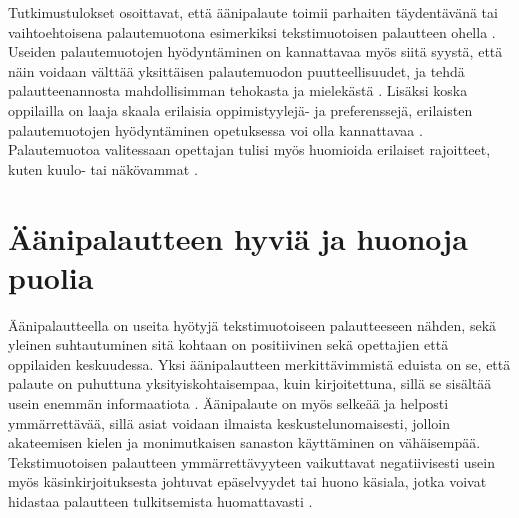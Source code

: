 \documentclass[utf8]{gradu3}
\begin{document}
Tutkimustulokset osoittavat, että äänipalaute toimii parhaiten täydentävänä  tai vaihtoehtoisena palautemuotona esimerkiksi tekstimuotoisen palautteen ohella \parencite[][]{academics, modes, ice}. Useiden palautemuotojen hyödyntäminen on kannattavaa myös siitä syystä, että näin voidaan välttää yksittäisen palautemuodon puutteellisuudet, ja tehdä palautteenannosta mahdollisimman tehokasta ja mielekästä \parencite[][]{modes}. Lisäksi koska oppilailla on laaja skaala erilaisia oppimistyylejä- ja preferenssejä, erilaisten palautemuotojen hyödyntäminen opetuksessa voi olla kannattavaa \parencite[][]{style}. Palautemuotoa valitessaan opettajan tulisi myös huomioida erilaiset rajoitteet, kuten kuulo- tai näkövammat \parencite[][]{evaluating}.

\section{Äänipalautteen hyviä ja huonoja puolia}

Äänipalautteella on useita hyötyjä tekstimuotoiseen palautteeseen nähden, sekä yleinen suhtautuminen sitä kohtaan on positiivinen sekä opettajien että oppilaiden keskuudessa. Yksi äänipalautteen merkittävimmistä eduista on se, että palaute on puhuttuna yksityiskohtaisempaa, kuin kirjoitettuna, sillä se sisältää usein enemmän informaatiota \parencite[][]{attitudes}. Äänipalaute on myös selkeää ja helposti ymmärrettävää, sillä asiat voidaan ilmaista keskustelunomaisesti, jolloin akateemisen kielen ja monimutkaisen sanaston käyttäminen on vähäisempää. Tekstimuotoisen palautteen ymmärrettävyyteen vaikuttavat negatiivisesti usein myös käsinkirjoituksesta johtuvat epäselvyydet tai huono käsiala, jotka voivat hidastaa palautteen tulkitsemista huomattavasti \parencite[][]{developing}.
\end{document}
